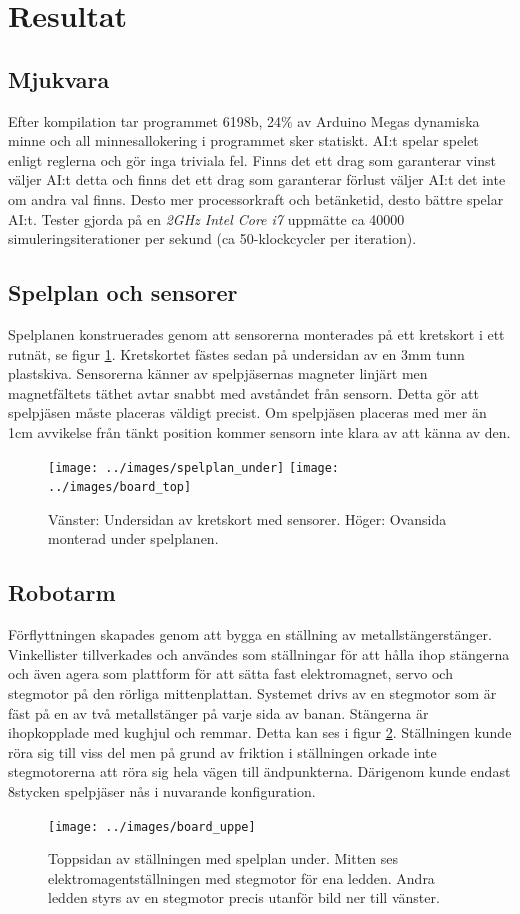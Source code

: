 \documentclass[a4paper]{article}
\begin{document}
\section{Resultat}

\subsection{Mjukvara}
Efter kompilation tar programmet 6198b, 24\% av Arduino Megas dynamiska minne och all minnesallokering i programmet sker statiskt.
AI:t spelar spelet enligt reglerna och gör inga triviala fel.
Finns det ett drag som garanterar vinst väljer AI:t detta och finns det ett drag som garanterar förlust väljer AI:t det inte om andra val finns.
Desto mer processorkraft och betänketid, desto bättre spelar AI:t.
Tester gjorda på en \textit{2GHz Intel Core i7} uppmätte ca 40000 simuleringsiterationer per sekund (ca 50-klockcycler per iteration).

\subsection{Spelplan och sensorer}
Spelplanen konstruerades genom att sensorerna monterades på ett kretskort i ett rutnät, se figur \ref{board}.
Kretskortet fästes sedan på undersidan av en 3mm tunn plastskiva.
Sensorerna känner av spelpjäsernas magneter linjärt men magnetfältets täthet avtar snabbt med avståndet från sensorn.
Detta gör att spelpjäsen måste placeras väldigt precist.
Om spelpjäsen placeras med mer än 1cm avvikelse från tänkt position kommer sensorn inte klara av att känna av den.
\begin{figure}
\centering
\texttt{[image: ../images/spelplan\_under]}
\texttt{[image: ../images/board\_top]}
\caption{Vänster: Undersidan av kretskort med sensorer. Höger: Ovansida monterad under spelplanen.}
\label{board}
\end{figure}

\subsection{Robotarm}
Förflyttningen skapades genom att bygga en ställning av metallstängerstänger.
Vinkellister tillverkades och användes som ställningar för att hålla ihop stängerna och även agera som plattform för att sätta fast elektromagnet, servo och stegmotor på den rörliga mittenplattan.
Systemet drivs av en stegmotor som är fäst på en av två metallstänger på varje sida av banan.
Stängerna är ihopkopplade med kughjul och remmar.
Detta kan ses i figur \ref{board_uppe}.
Ställningen kunde röra sig till viss del men på grund av friktion i ställningen orkade inte stegmotorerna att röra sig hela vägen till ändpunkterna.
Därigenom kunde endast 8stycken spelpjäser nås i nuvarande konfiguration.
\begin{figure}
\centering
\texttt{[image: ../images/board\_uppe]}
\caption{Toppsidan av ställningen med spelplan under. Mitten ses elektromagentställningen med stegmotor för ena ledden. Andra ledden styrs av en stegmotor precis utanför bild ner till vänster.}
\label{board_uppe}
\end{figure}
\end{document}
